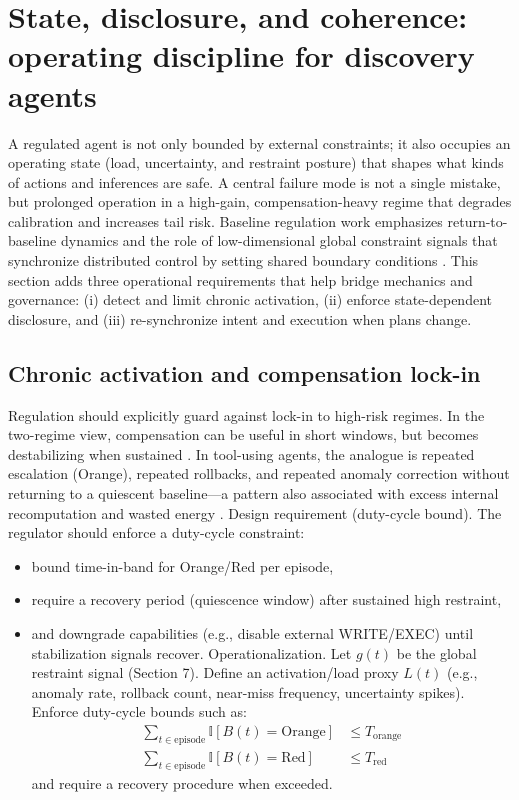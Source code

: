 \documentclass[11pt]{article}
\begin{document}
\section{State, disclosure, and coherence: operating discipline for discovery agents}
A regulated agent is not only bounded by external constraints; it also occupies an operating state
(load, uncertainty, and restraint posture) that shapes what kinds of actions and inferences are
safe. A central failure mode is not a single mistake, but prolonged operation in a high-gain,
compensation-heavy regime that degrades calibration and increases tail risk. Baseline regulation
work emphasizes return-to-baseline dynamics and the role of low-dimensional global constraint
signals that synchronize distributed control by setting shared boundary conditions \citep{jeffreys2025baseline_constraint}.
This section adds three operational requirements that help bridge mechanics and governance: (i)
detect and limit chronic activation, (ii) enforce state-dependent disclosure, and (iii) re-synchronize
intent and execution when plans change.
\subsection{Chronic activation and compensation lock-in}
Regulation should explicitly guard against lock-in to high-risk regimes. In the two-regime view,
compensation can be useful in short windows, but becomes destabilizing when sustained \citep{jeffreys2026two_regime_control}. In
tool-using agents, the analogue is repeated escalation (Orange), repeated rollbacks, and repeated
anomaly correction without returning to a quiescent baseline—a pattern also associated with excess
internal recomputation and wasted energy \citep{jeffreys2026waste_energy}.
Design requirement (duty-cycle bound). The regulator should enforce a duty-cycle
constraint:
\begin{itemize}
\item 
bound time-in-band for Orange/Red per episode,
\item 
require a recovery period (quiescence window) after sustained high restraint,
\item 
and downgrade capabilities (e.g., disable external WRITE/EXEC) until stabilization signals
recover.
Operationalization. Let $g(t)$ be the global restraint signal (Section 7). Define an activation/load proxy $L(t)$ (e.g., anomaly rate, rollback count, near-miss frequency, uncertainty spikes). Enforce duty-cycle bounds such as:
\begin{align}
\sum_{t \in \text{episode}} \mathbb{I}[B(t)=\mathrm{Orange}] &\le T_{\mathrm{orange}} \\
\sum_{t \in \text{episode}} \mathbb{I}[B(t)=\mathrm{Red}] &\le T_{\mathrm{red}}
\end{align}
and require a recovery procedure when exceeded.
\end{itemize}
\end{document}
